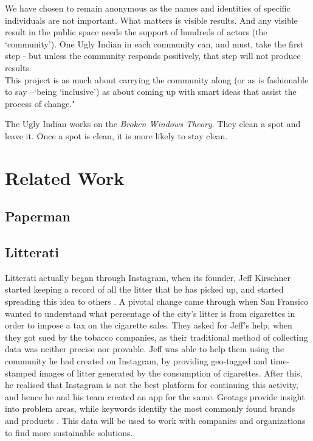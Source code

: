 \documentclass[10pt]{article}
\begin{document}
We have chosen to remain anonymous as the names and identities of specific individuals are not important. What matters is visible results. And any visible result in the public space needs the support of hundreds of actors (the ‘community’). One Ugly Indian in each community can, and must, take the first step - but unless the community responds positively, that step will not produce results.\\
This project is as much about carrying the community along (or as is fashionable to say –‘being ‘inclusive’) as about coming up with smart ideas that assist the process of change."

The Ugly Indian works on the \emph{Broken Windows Theory}. They clean a spot and leave it. Once a spot is clean, it is more likely to stay clean.

\section{Related Work}



\subsection {Paperman}



\subsection{Litterati}

Litterati actually began through Instagram, when its founder, Jeff Kirschner started keeping a record of all the litter that he has picked up, and started spreading this idea to others \citep{Litterati:TED_talk}. A pivotal change came through when San Fransico wanted to understand what percentage of the city's litter is from cigarettes in order to impose a tax on the cigarette sales. They asked for Jeff's help, when they got sued by the tobacco companies, as their traditional method of collecting data was neither precise nor provable. Jeff was able to help them using the community he had created on Instagram, by providing geo-tagged and time-stamped images of litter generated by the consumption of cigarettes. After this, he realised that Instagram is not the best platform for continuing this activity, and hence he and his team created an app for the same.
Geotags provide insight into problem areas, while keywords identify the most commonly found brands and products \citep{Litterati:about}. This data will be used to work with companies and organizations to find more sustainable solutions.
\end{document}
